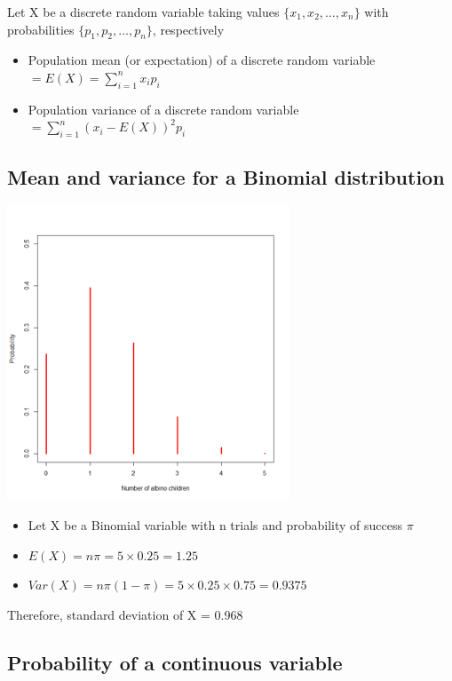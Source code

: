 \documentclass[
]{book}
\providecommand{\tightlist}{%
  \setlength{\itemsep}{0pt}\setlength{\parskip}{0pt}}
\begin{document}
Let X be a discrete random variable taking values \(\{x_1, x_2, …, x_n\}\) with probabilities \(\{p_1, p_2, …, p_n\}\), respectively

\begin{itemize}
\tightlist
\item
  Population mean (or expectation) of a discrete random variable \(=E(X)=\sum_{i=1}^nx_ip_i\)
\item
  Population variance of a discrete random variable \(=\sum_{i=1}^n(x_i-E(X))^2p_i\)
\end{itemize}

\hypertarget{mean-and-variance-for-a-binomial-distribution}{%
\subsection{Mean and variance for a Binomial distribution}\label{mean-and-variance-for-a-binomial-distribution}}

\includegraphics[width=0.5\linewidth]{./2_44}

\begin{itemize}
\tightlist
\item
  Let X be a Binomial variable with n trials and probability of success \(\pi\)
\item
  \(E(X)=n\pi=5\times 0.25=1.25\)
\item
  \(Var(X)=n\pi(1-\pi)=5\times 0.25\times 0.75 = 0.9375\)
\end{itemize}

Therefore, standard deviation of X = 0.968

\hypertarget{probability-of-a-continuous-variable}{%
\subsection{Probability of a continuous variable}\label{probability-of-a-continuous-variable}}
\end{document}
